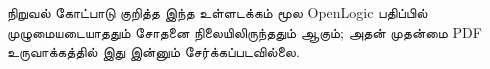 \documentclass[../../include/open-logic-part]{subfiles}
\begin{document}

\begin{editorial}
  நிறுவல் கோட்பாடு குறித்த இந்த உள்ளடக்கம் மூல OpenLogic பதிப்பில்
  முழுமையடையாததும் சோதனை நிலையிலிருந்ததும் ஆகும்; அதன் முதன்மை
  PDF உருவாக்கத்தில் இது இன்னும் சேர்க்கப்படவில்லை.
\end{editorial}


\OLEndPartHook
\end{document}
